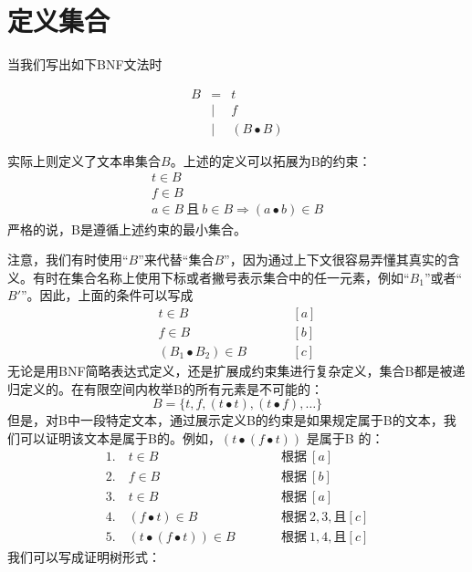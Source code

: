 \documentclass{book}
\begin{document}
\section{定义集合}
当我们写出如下BNF文法时
\begin{framed}
$$
\begin{array}{lcl}
B & = & t \\
& | & f \\
& | & (B\bullet B)
\end{array}
$$
\end{framed}
实际上则定义了文本串集合$B$。上述的定义可以拓展为B的约束：
$$
\begin{array}{c}
t\in{B}\\
f\in{B}\\
a\in{B}\ \text{且}\ b\in{B}\Rightarrow(a\bullet b)\in{B}
\end{array}
$$
严格的说，B是遵循上述约束的最小集合。\par
注意，我们有时使用“$B$”来代替“集合$B$”，因为通过上下文很容易弄懂其真实的含义。有时在集合名称上使用下标或者撇号表示集合中的任一元素，例如“$B_1$”或者“$B'$”。因此，上面的条件可以写成
$$
\begin{array}{cll}
t\in{B} & \qquad & [a] \\
f\in{B} & \qquad & [b] \\
(B_1\bullet B_2) \in B & \qquad & [c]
\end{array}
$$
无论是用BNF简略表达式定义，还是扩展成约束集进行复杂定义，集合B都是被递归定义的。在有限空间内枚举B的所有元素是不可能的：
$$B=\{t,f,(t\bullet t),(t\bullet f),\ldots\}$$
但是，对B中一段特定文本，通过展示定义B的约束是如果规定属于B的文本，我们可以证明该文本是属于B的。例如，$(t\bullet{(f\bullet{t})})$ 是属于B 的：
$$
\begin{array}{lll}
1.\quad t\in{B} & \qquad & \text{根据}\ [a] \\
2.\quad f\in{B} & \qquad & \text{根据}\ [b] \\
3.\quad t\in{B} & \qquad & \text{根据}\ [a] \\
4.\quad (f\bullet{t})\in{B} & \qquad & \text{根据}\ 2,3,\text{且}[c] \\
5.\quad (t\bullet (f\bullet{t}))\in{B} & \qquad & \text{根据}\ 1,4,\text{且}[c]
\end{array}
$$
我们可以写成证明树形式：
\begin{prooftree}
\end{prooftree}
\end{document}
